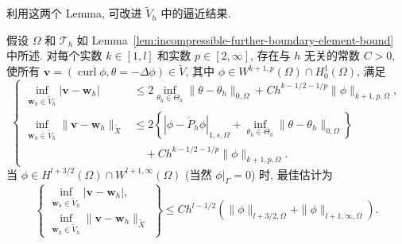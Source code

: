 利用这两个 Lemma, 可改进 $\widetilde V_h$ 中的逼近结果.

\begin{Lemma}\label{lem:incompressible-further-improved-kernel-approximation}
假设 $\Omega$ 和 $\mathcal T_h$ 如
Lemma~\ref{lem:incompressible-further-boundary-element-bound} 中所述.
对每个实数 $k\in[1,l]$ 和实数 $p\in[2,\infty]$,
存在与 $h$ 无关的常数 $C>0$, 使所有
$\mathbf v=(\operatorname{curl}\phi,\theta=-\Delta\phi)
\in\widetilde V$, 其中
$\phi\in W^{k+1,p}(\Omega)\cap H_0^1(\Omega)$, 满足
\begin{equation}\label{eq:incompressible-further-improved-kernel-approximation}
\left\{
\begin{aligned}
\inf_{\mathbf w_h\in\widetilde V_h}|\mathbf v-\mathbf w_h|
&\leq2\inf_{\theta_h\in\Theta_h}
\|\theta-\theta_h\|_{0,\Omega}
+Ch^{k-1/2-1/p}\|\phi\|_{k+1,p,\Omega},\\
\inf_{\mathbf w_h\in\widetilde V_h}
\|\mathbf v-\mathbf w_h\|_{\widetilde X}
&\leq2\left\{
|\phi-\mathring P_h\phi|_{1,s,\Omega}
+\inf_{\theta_h\in\Theta_h}\|\theta-\theta_h\|_{0,\Omega}
\right\}\\
&\quad+Ch^{k-1/2-1/p}\|\phi\|_{k+1,p,\Omega}.
\end{aligned}
\right.
\end{equation}
当
$\phi\in H^{l+3/2}(\Omega)\cap W^{l+1,\infty}(\Omega)$
(当然 $\phi|_\Gamma=0$) 时, 最佳估计为
\begin{equation}\label{eq:incompressible-further-best-kernel-approximation}
\left\{
\begin{aligned}
\inf_{\mathbf w_h\in\widetilde V_h}|\mathbf v-\mathbf w_h|,\\
\inf_{\mathbf w_h\in\widetilde V_h}
\|\mathbf v-\mathbf w_h\|_{\widetilde X}
\end{aligned}
\right\}
\leq Ch^{l-1/2}
\left(\|\phi\|_{l+3/2,\Omega}
+\|\phi\|_{l+1,\infty,\Omega}\right).
\end{equation}
\end{Lemma}

